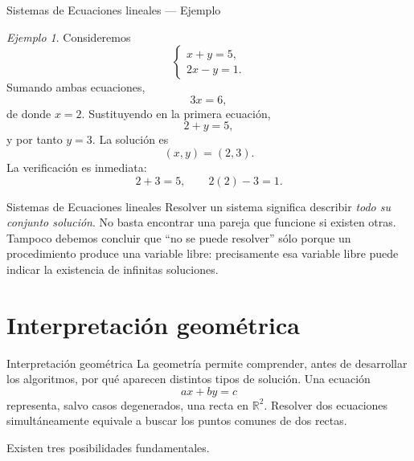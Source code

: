 \documentclass[aspectratio=169,11pt]{beamer}
\theoremstyle{remark}
\newtheorem{ejemplo}[definicion]{Ejemplo}
\newcommand{\R}{\mathbb{R}}
\begin{document}
\begin{frame}[shrink=5]{Sistemas de Ecuaciones lineales — Ejemplo}
\footnotesize
\begin{ejemplo}
Consideremos
\[
\begin{cases}
x+y=5,\\
2x-y=1.
\end{cases}
\]
Sumando ambas ecuaciones,
\[
3x=6,
\]
de donde $x=2$. Sustituyendo en la primera ecuación,
\[
2+y=5,
\]
y por tanto $y=3$. La solución es
\[
(x,y)=(2,3).
\]
La verificación es inmediata:
\[
2+3=5,\qquad 2(2)-3=1.
\]
\end{ejemplo}
\end{frame}

\begin{frame}[allowframebreaks]{Sistemas de Ecuaciones lineales}
\footnotesize
Resolver un sistema significa describir \emph{todo su conjunto solución}. No basta encontrar una pareja que funcione si existen otras. Tampoco debemos concluir que ``no se puede resolver'' sólo porque un procedimiento produce una variable libre: precisamente esa variable libre puede indicar la existencia de infinitas soluciones.
\end{frame}

\section*{Interpretación geométrica}
\begin{frame}[allowframebreaks]{Interpretación geométrica}
\footnotesize
La geometría permite comprender, antes de desarrollar los algoritmos, por qué aparecen distintos tipos de solución.
Una ecuación
\[
ax+by=c
\]
representa, salvo casos degenerados, una recta en $\R^2$. Resolver dos ecuaciones simultáneamente equivale a buscar los puntos comunes de dos rectas.

Existen tres posibilidades fundamentales.
\end{frame}
\end{document}
